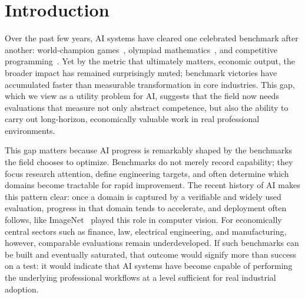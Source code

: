 \vspace{-1em}
\section{Introduction}
\vspace{-.5em}
Over the past few years, AI systems have cleared one celebrated benchmark after another: world-champion
games~\citep{silver2016alphago}, olympiad mathematics~\citep{deepmind2025geminiimo}, and
competitive programming~\citep{google2025geminiicpc}. Yet by the metric that ultimately matters, economic output, the broader impact has remained surprisingly muted; benchmark victories have accumulated faster than measurable transformation in core industries. This gap, which we view as a utility problem for AI, suggests that the field now needs evaluations that measure not only abstract competence, but also the ability to carry out long-horizon, economically valuable work in real professional environments. 

This gap matters because AI progress is remarkably shaped by the benchmarks the field chooses to optimize. Benchmarks do not merely record capability; they focus research attention, define engineering targets, and often determine which domains become tractable for rapid improvement. The recent history of AI makes this pattern clear: once a domain is captured by a verifiable and widely used evaluation, progress in that domain tends to accelerate, and deployment often follows, like ImageNet~\citep{deng2009imagenet} played this role in computer vision. For economically central sectors such as finance, law, electrical engineering, and manufacturing, however, comparable evaluations remain underdeveloped. If such benchmarks can be built and eventually saturated, that outcome would signify more than success on a test: it would indicate that AI systems have become capable of performing the underlying professional workflows at a level sufficient for real industrial adoption.

